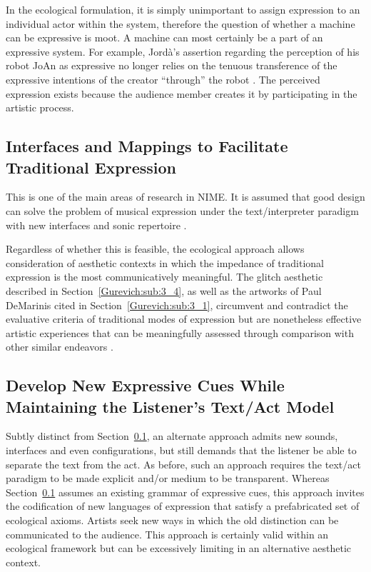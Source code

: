 In the ecological formulation, it is simply unimportant to assign expression to an individual actor within the system, therefore the question of whether a machine can be expressive is moot. A machine can most certainly be a part of an expressive system. For example, Jord{\`a}'s assertion regarding the perception of his robot JoAn as expressive no longer relies on the tenuous transference of the expressive intentions of the creator ``through'' the robot \cite{Jorda:2005}. The perceived expression exists because the audience member creates it by participating in the artistic process.

\subsection{Interfaces and Mappings to Facilitate Traditional Expression}
\label{Gurevich:sub:5_2}
This is one of the main areas of research in NIME. It is assumed that good design can solve the problem of musical expression under the text/interpreter paradigm with new interfaces and sonic repertoire \cite{Camurri:2004,Paradiso:1997c,Wanderley:1999a}.

Regardless of whether this is feasible, the ecological approach allows consideration of aesthetic contexts in which the impedance of traditional expression is the most communicatively meaningful. The glitch aesthetic described in Section~\ref{Gurevich:sub:3_4}, as well as the artworks of Paul DeMarinis cited in Section~\ref{Gurevich:sub:3_1}, circumvent and contradict the evaluative criteria of traditional modes of expression but are nonetheless effective artistic experiences that can be meaningfully assessed through comparison with other similar endeavors \cite{:2004a}.

\subsection{Develop New Expressive Cues While Maintaining the Listener's Text/Act Model}
\label{Gurevich:sub:5_3}
Subtly distinct from Section~\ref{Gurevich:sub:5_2}, an alternate approach admits new sounds, interfaces and even configurations, but still demands that the listener be able to separate the text from the act. As before, such an approach requires the text/act paradigm to be made explicit and/or medium to be transparent. Whereas Section~\ref{Gurevich:sub:5_2} assumes an existing grammar of expressive cues, this approach invites the codification of new languages of expression that satisfy a prefabricated set of ecological axioms. Artists seek new ways in which the old distinction can be communicated to the audience. This approach is certainly valid within an ecological framework but can be excessively limiting in an alternative aesthetic context.

